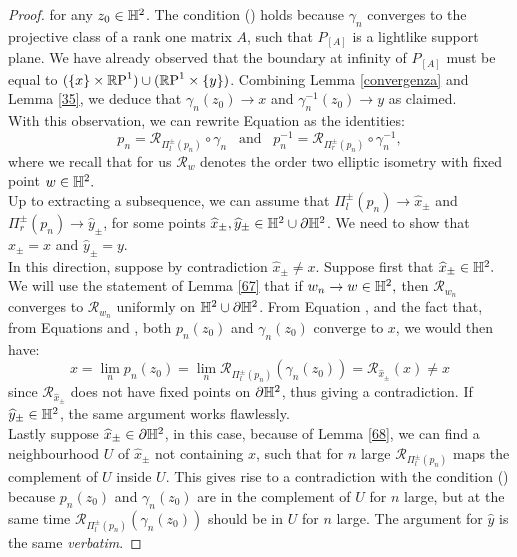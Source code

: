 \begin{proof}
  for any $z_0\in\H^2$. The condition () holds because $\gamma_n$ converges to the projective class of a rank one matrix $A$, such that $P_{[A]}$ is a lightlike support plane. We have already observed that the boundary at infinity of $P_{[A]}$ must be equal to $(\{x\}\times\S)\cup(\S\times\{y\})$. Combining Lemma \ref{convergenza} and Lemma \ref{35}, we deduce that $\gamma_n(z_0)\to x$ and $\gamma_n^{-1}(z_0)\to y$ as claimed. \\
  With this observation, we can rewrite Equation  as the identities: 
  \begin{equation}\label{21}
    p_n=\mathcal{R}_{\Pi_l^\pm(p_n)}\circ\gamma_n \;\;\; \text{and}\;\;\; p_n^{-1}=\mathcal{R}_{\Pi_r^\pm(p_n)}\circ\gamma_n^{-1}, 
  \end{equation} 
  where we recall that for us $\mathcal{R}_w$ denotes the order two elliptic isometry with fixed point $w\in\H^2.$ \\
  Up to extracting a subsequence, we can assume that $\Pi_l^{\pm}(p_n)\to\widehat{x}_\pm$ and $\Pi_r^\pm(p_n)\to\widehat{y}_\pm$, for some points $\widehat{x}_\pm, \widehat{y}_\pm\in\H^2\cup\partial\H^2$. We need to show that $\widehat{x}_\pm=x$ and $\widehat{y}_\pm=y$. \\
  In this direction, suppose by contradiction $\widehat{x}_\pm\neq x$. Suppose first that $\widehat{x}_\pm\in\H^2.$ We will use the statement of Lemma \ref{67}
  that if $w_n\to w\in \H^2,$ then $\mathcal{R}_{w_n}$ converges to $\mathcal{R}_{w_n}$ uniformly on $\H^2\cup\partial\H^2$. From Equation , and the fact that, from Equations  and , both $p_n(z_0)$ and $\gamma_n(z_0)$ converge to $x$, we would then have: 
  \[
    x=\lim_n p_n(z_0)=\lim_n\mathcal{R}_{\Pi_l^\pm(p_n)}(\gamma_n(z_0))=\mathcal{R}_{\widehat{x}_\pm}(x)\neq x
  \]
  since $\mathcal{R}_{\widehat{x}_\pm}$ does not have fixed points on $\partial\H^2$, thus giving a contradiction. If $\widehat{y}_\pm\in\H^2$, the same argument works flawlessly. \\
  Lastly suppose $\widehat{x}_\pm\in\partial\H^2$, in this case, because of Lemma \ref{68}, we can find a neighbourhood $U$ of $\widehat{x}_\pm$ not containing $x$, such that for $n$ large $\mathcal{R}_{\Pi_l^\pm(p_n)}$ maps the complement of $U$ inside $U$. This gives rise to a contradiction with the condition  () because $p_n(z_0)$ and $\gamma_n(z_0)$ are in the complement of $U$ for $n$ large, but at the same time $\mathcal{R}_{\Pi_l^{\pm}(p_n)}(\gamma_n(z_0))$ should be in $U$ for $n$ large. The argument for $\widehat{y}$ is the same \textit{verbatim}.
\end{proof}

